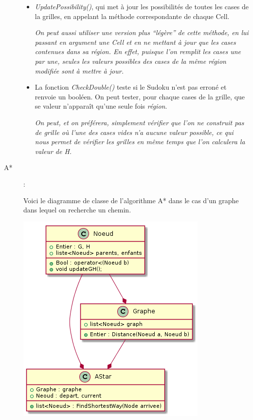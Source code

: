 \begin{description}
\begin{itemize}
\item \textit{UpdatePossibility()}, qui met à jour les possibilités de toutes les cases de la grilles, en appelant la méthode correspondante de chaque Cell.

\textit{On peut aussi utiliser une version plus ``légère'' de cette méthode, en lui passant en argument une Cell et en ne mettant à jour que les cases contenues dans sa région. En effet, puisque l'on remplit les cases une par une, seules les valeurs possibles des cases de la  même région modifiée sont à mettre à jour.}

\item La fonction \textit{CheckDouble()} teste si le Sudoku n'est pas erroné et renvoie un booléen. On peut tester, pour chaque cases de la grille, que se valeur n'apparaît qu'une seule fois \textit{région}.

\textit{On peut, et on préférera, simplement vérifier que l'on ne construit pas de grille où l'une des cases vides n'a aucune valeur possible, ce qui nous permet de vérifier les grilles en même temps que l'on calculera la valeur de H.}

\end{itemize}
                
                
                
                
                
                \item[A*] :
 
 Voici le diagramme de classe de l'algorithme A* dans le cas d'un graphe dans lequel on recherche un chemin.
 
 \begin{center}
                \includegraphics[scale=0.5]{images/Astar_classe.png}               
              

\end{center}
\end{description}
